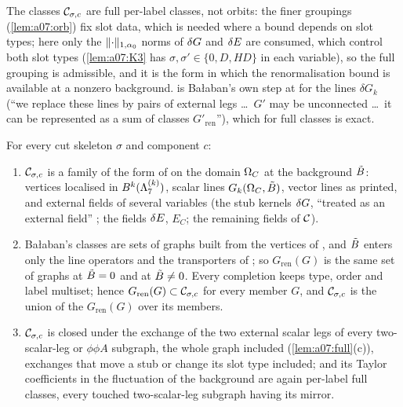 The classes $\mathcal C_{\sigma,c}$ are full per-label classes, not orbits: the finer groupings (\cref{lem:a07:orb}) fix slot data, which is needed where a bound depends on slot types; here only the $\lVert \cdot\rVert_{1,\alpha_0}$ norms of $\delta G$ and $\delta E$ are consumed, which control both slot types (\cref{lem:a07:K3} has $\sigma,\sigma'\in\{0,D,HD\}$ in each variable), so the full grouping is admissible, and it is the form in which the renormalisation bound is available at a nonzero background.  is Ba{\l}aban's own step at \cite[p.~432]{Ba3} for the lines $\delta G_k$ (``we replace these lines by pairs of external legs \dots\ $G'$ may be unconnected \dots\ it can be represented as a sum of classes $G'_{\mathrm{ren}}$''), which for full classes is exact.

\begin{lemma}\label{lem:a07:S}
For every cut skeleton $\sigma$ and component $c$:
\begin{enumerate}[label=\textup{(\alph*)},nosep,leftmargin=*]
\item $\mathcal C_{\sigma,c}$ is a family of the form of \cite[Prop.~1]{Ba3} on the domain $\Omega_{C}$ at the background $\tilde B$: vertices \cite[(1.6)--(1.15)]{Ba3} localised in $B^k(\Lambda^{(k)}_{7})$, scalar lines $G_k(\Omega_{C},\tilde B)$, vector lines as printed, and external fields of several variables (the stub kernels $\delta G$, ``treated as an external field'' \cite[pp.~414, 419]{Ba3}; the fields $\delta E$, $E_C$; the remaining fields of $\mathcal C$).
\item Ba{\l}aban's classes are sets of graphs built from the vertices of \cite[(1.5)]{Ba3}, and $\tilde B$ enters only the line operators and the transporters of \cite[(1.12)--(1.15)]{Ba3}; so $G_{\mathrm{ren}}(G)$ is the same set of graphs at $\tilde B=0$ and at $\tilde B\ne0$. Every completion keeps type, order and label multiset; hence $G_{\mathrm{ren}}(G)\subset\mathcal C_{\sigma,c}$ for every member $G$, and $\mathcal C_{\sigma,c}$ is the union of the $G_{\mathrm{ren}}(G)$ over its members.
\item $\mathcal C_{\sigma,c}$ is closed under the exchange of the two external scalar legs of every two-scalar-leg or $\phi\phi A$ subgraph, the whole graph included (\cref{lem:a07:full}(c)), exchanges that move a stub or change its slot type included; and its Taylor coefficients in the fluctuation of the background are again per-label full classes, every touched two-scalar-leg subgraph having its mirror.

\end{enumerate}
\end{lemma}
